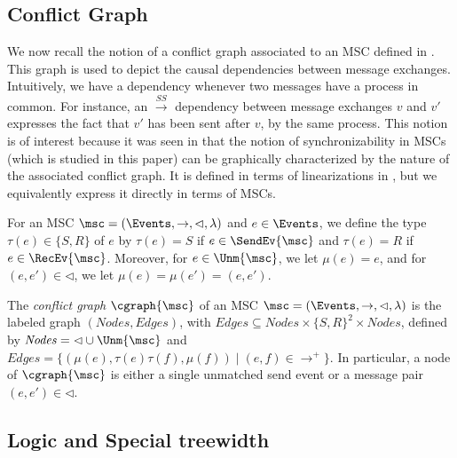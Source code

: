 \subsection{Conflict Graph}


We now recall the notion of a conflict graph associated to an MSC defined in \cite{DBLP:conf/cav/BouajjaniEJQ18}. This graph is used to depict the causal dependencies between message exchanges.  Intuitively, we have a dependency whenever
two messages have a process in common. For instance, an $\xrightarrow{SS}$
dependency between message exchanges $v$ and $v'$ expresses the fact that
$v'$ has been sent after $v$, by the same process. This notion is of interest because it was seen in \cite{DBLP:conf/cav/BouajjaniEJQ18} that the notion of synchronizability in MSCs (which is studied in this paper) can be graphically characterized by the nature of the associated conflict graph.
It is defined in terms of linearizations
in \cite{DBLP:conf/fossacs/GiustoLL20}, but we equivalently express it
directly in terms of MSCs.

\newcommand{\type}{\tau}
\newcommand{\stype}{S}
\newcommand{\rtype}{R}
\newcommand{\mexch}{\mu}
\newcommand{\Edges}{\mathit{Edges}}
\newcommand{\Nodes}{\mathit{Nodes}}

For an MSC $\msc = (\Events, \rightarrow, \lhd, \lambda)$ and
$e \in \Events$, we define the type $\type(e) \in \{\stype,\rtype\}$ of $e$ by $\type(e) = \stype$ if $e \in \SendEv{\msc}$
and $\type(e) = \rtype$ if $e \in \RecEv{\msc}$.
Moreover, for $e \in \Unm{\msc}$, we let $\mexch(e) = e$,
and for $(e,e') \in \lhd$, we let $\mexch(e) = \mexch(e') = (e,e')$.


\begin{definition}
	The \emph{conflict graph} $\cgraph{\msc}$ of an MSC $\msc = (\Events, \rightarrow, \lhd, \lambda)$ is the labeled graph $(\Nodes, \Edges)$, with $\Edges \subseteq \Nodes \times \{\stype,\rtype\}^2 \times \Nodes$, defined by
	$\Nodes = {\lhd} \cup \Unm{\msc}$ and $\Edges = \{(\mu(e),\type(e)\type(f),\mu(f)) \mid (e,f) \in {\to^+}\}$.
In particular, a node of $\cgraph{\msc}$ is either a single unmatched send event or a message pair $(e,e') \in {\lhd}$.
\end{definition}	

\subsection{Logic and Special treewidth}

